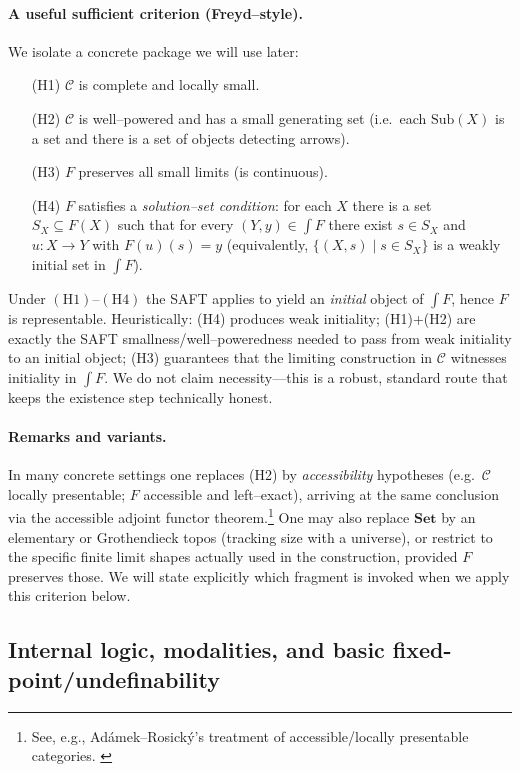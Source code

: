\documentclass[11pt]{article}
\theoremstyle{upright}
\begin{document}
\paragraph{A useful sufficient criterion (Freyd–style).}
We isolate a concrete package we will use later:
\begin{itemize}[leftmargin=2em]
  \item[(H1)] $\mathcal C$ is complete and locally small.
  \item[(H2)] $\mathcal C$ is well–powered and has a small generating set (i.e.\ each $\mathrm{Sub}(X)$ is a set and there is a set of objects detecting arrows).
  \item[(H3)] $F$ preserves all small limits (is continuous).
  \item[(H4)] $F$ satisfies a \emph{solution–set condition}: for each $X$ there is a set $S_X\subseteq F(X)$ such that for every $(Y,y)\in\int F$ there exist $s\in S_X$ and $u:X\to Y$ with $F(u)(s)=y$ (equivalently, $\{(X,s)\mid s\in S_X\}$ is a weakly initial set in $\int F$).
\end{itemize}
Under \((\mathrm H1)\)–\((\mathrm H4)\) the SAFT applies to yield an \emph{initial} object of $\int F$, hence $F$ is representable. Heuristically: (H4) produces weak initiality; (H1)+(H2) are exactly the SAFT smallness/well–poweredness needed to pass from weak initiality to an initial object; (H3) guarantees that the limiting construction in $\mathcal C$ witnesses initiality in $\int F$. We do not claim necessity—this is a robust, standard route that keeps the existence step technically honest.

\paragraph{Remarks and variants.}
In many concrete settings one replaces (H2) by \emph{accessibility} hypotheses (e.g.\ $\mathcal C$ locally presentable; $F$ accessible and left–exact), arriving at the same conclusion via the accessible adjoint functor theorem.\footnote{See, e.g., Adámek--Rosický’s treatment of accessible/locally presentable categories. \citep{AdamekRosicky1994}} One may also replace $\mathbf{Set}$ by an elementary or Grothendieck topos (tracking size with a universe), or restrict to the specific finite limit shapes actually used in the construction, provided $F$ preserves those. We will state explicitly which fragment is invoked when we apply this criterion below.

\subsection{Internal logic, modalities, and basic fixed-point/undefinability}
\end{document}
